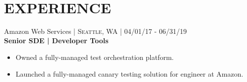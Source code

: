\documentclass[10pt]{article} %
\begin{document}
\color{text1} %


\par{\\ %
	

\begin{minipage}[t]{0.57\textwidth} %
\vspace{0pt} %
	

\section{\uppercase{\textbf{Experience}}}


{\raggedright\large Amazon Web Services \normalsize\textsc{ | Seattle, WA} | 04/01/17 - 06/31/19\\
\textbf{Senior SDE | Developer Tools}\\[5pt]}
\vspace{0pt}
\begin{itemize}\itemsep-0.25em
    \item Owned a fully-managed test orchestration platform.
    \item Launched a fully-managed canary testing solution for engineer at Amazon. 
\end{itemize}\\



\end{minipage}}
\end{document}
